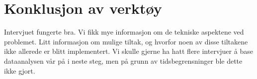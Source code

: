 \section{Konklusjon av verktøy}
Intervjuet fungerte bra. Vi fikk mye informasjon om de tekniske aspektene ved problemet. Litt informasjon om mulige tiltak, og hvorfor noen av disse tiltakene ikke allerede er blitt implementert. Vi skulle gjerne ha hatt flere intervjuer å base dataanalysen vår på i neste steg, men på grunn av tidsbegrensninger ble dette ikke gjort.